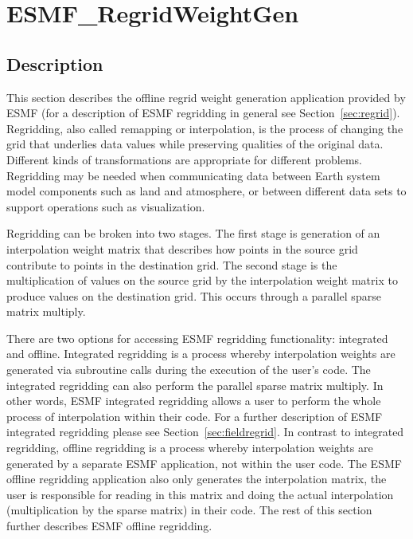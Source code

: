
\section{ESMF\_RegridWeightGen}
\label{sec:ESMF_RegridWeightGen}

\subsection{Description}

This section describes the offline regrid weight generation application provided by ESMF (for a description of ESMF regridding in general see Section~\ref{sec:regrid}). Regridding, also called remapping or interpolation, is the process of changing the grid that underlies data values while preserving qualities of the original data. Different kinds of transformations are appropriate for different problems. Regridding may be needed when communicating data between Earth system model components such as land and atmosphere, or between different data sets to support operations such as visualization. 

Regridding can be broken into two stages. The first stage is generation of an interpolation weight matrix that describes how points in
the source grid contribute to points in the destination grid. The second stage is the multiplication of values on the source grid by the
interpolation weight matrix to produce values on the destination grid. This occurs through a parallel sparse matrix multiply.

There are two options for accessing ESMF regridding functionality: integrated and offline. Integrated regridding is a process whereby interpolation
weights are generated via subroutine calls during the execution of the user's code. The integrated regridding can also perform the parallel sparse
matrix multiply. In other words, ESMF integrated regridding allows a user to perform the whole process of interpolation within their code.
For a further description of ESMF integrated regridding please see Section~\ref{sec:fieldregrid}. 
In contrast to integrated regridding,
offline regridding is a process whereby interpolation weights are generated by a separate ESMF application, not within the user code. The ESMF offline
regridding application also only generates the interpolation matrix, the user is responsible for reading in this matrix and doing the actual interpolation
 (multiplication by the sparse matrix) in their code. The rest of this section further describes ESMF offline regridding.

